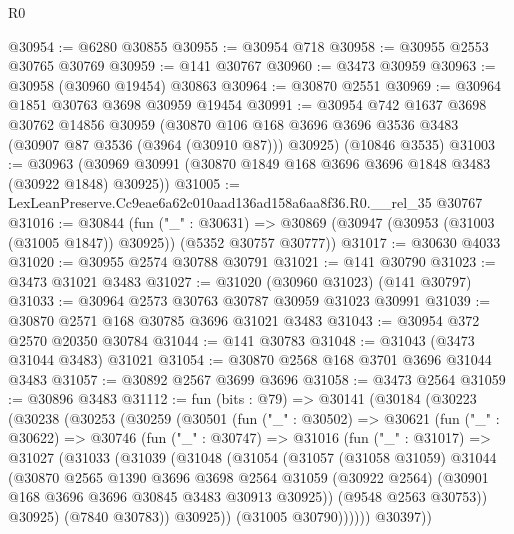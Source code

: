 \begin{lexlean}{R0}
\begin{coremodule}
@30954 := @6280 @30855
@30955 := @30954 @718
@30958 := @30955 @2553 @30765 @30769
@30959 := @141 @30767
@30960 := @3473 @30959
@30963 := @30958 (@30960 @19454) @30863
@30964 := @30870 @2551
@30969 := @30964 @1851 @30763 @3698 @30959 @19454
@30991 := @30954
    @742
    @1637
    @3698
    @30762
    @14856
    @30959
    (@30870 @106 @168 @3696 @3696 @3536 @3483 (@30907 @87 @3536 (@3964 (@30910 @87))) @30925)
    (@10846 @3535)
@31003 := @30963 (@30969 @30991 (@30870 @1849 @168 @3696 @3696 @1848 @3483 (@30922 @1848) @30925))
@31005 := LexLeanPreserve.Cc9eae6a62c010aad136ad158a6aa8f36.R0.__rel_35 @30767
@31016 := @30844
    (fun ("_" : @30631) =>
    @30869 (@30947 (@30953 (@31003 (@31005 @1847)) @30925)) (@5352 @30757 @30777))
@31017 := @30630 @4033
@31020 := @30955 @2574 @30788 @30791
@31021 := @141 @30790
@31023 := @3473 @31021 @3483
@31027 := @31020 (@30960 @31023) (@141 @30797)
@31033 := @30964 @2573 @30763 @30787 @30959 @31023 @30991
@31039 := @30870 @2571 @168 @30785 @3696 @31021 @3483
@31043 := @30954 @372 @2570 @20350 @30784
@31044 := @141 @30783
@31048 := @31043 (@3473 @31044 @3483) @31021
@31054 := @30870 @2568 @168 @3701 @3696 @31044 @3483
@31057 := @30892 @2567 @3699 @3696
@31058 := @3473 @2564
@31059 := @30896 @3483
@31112 := fun (bits : @79) =>
  @30141
    (@30184
      (@30223
        (@30238
          (@30253
            (@30259
              (@30501
                (fun ("_" : @30502) =>
                @30621
                  (fun ("_" : @30622) =>
                  @30746
                    (fun ("_" : @30747) =>
                    @31016
                      (fun ("_" : @31017) =>
                      @31027
                        (@31033
                          (@31039
                            (@31048
                              (@31054
                                (@31057
                                  (@31058 @31059)
                                  @31044
                                  (@30870
                                    @2565
                                    @1390
                                    @3696
                                    @3698
                                    @2564
                                    @31059
                                    (@30922 @2564)
                                    (@30901 @168 @3696 @3696 @30845 @3483 @30913 @30925))
                                  (@9548 @2563 @30753))
                                @30925)
                              (@7840 @30783))
                            @30925))
                        (@31005 @30790))))))
              @30397))

\end{coremodule}
\end{lexlean}

